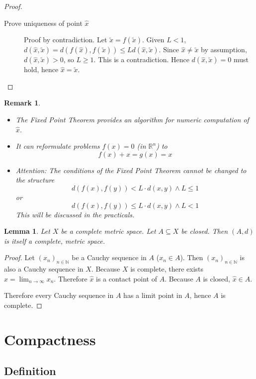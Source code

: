 \documentclass{article}
\newtheorem{lemma}{Lemma}  \numberwithin{lemma}{section}
\newtheorem{remark}{Remark}  \numberwithin{remark}{section}
\begin{document}
\begin{proof}
\begin{description}
  \item[Prove uniqueness of point $\hat{x}$]
    Proof by contradiction.
    Let $\tilde{x} = f(\tilde{x})$. Given $L < 1$, $d(\hat{x}, \tilde{x}) = d(f(\hat{x}), f(\tilde{x})) \leq L d(\hat{x}, \tilde{x})$.
    Since $\hat{x} \neq \tilde{x}$ by assumption, $d(\hat{x}, \tilde{x}) > 0$, so $L \geq 1$. This is a contradiction.
    Hence $d(\hat{x}, \tilde{x}) = 0$ must hold, hence $\hat{x} = \tilde{x}$.
  \end{description}
\end{proof}

\begin{remark}
  \begin{itemize}
  	\item The Fixed Point Theorem provides an algorithm for numeric computation of $\hat{x}$.
    \item It can reformulate problems $f(x) = 0$ (in $\mathbb R^n$) to
      \[ f(x) + x = g(x) = x \]
    \item Attention: The conditions of the Fixed Point Theorem cannot be changed to the structure
      \[ d(f(x), f(y)) < L \cdot d(x, y) \land L \leq 1 \]
      or
      \[ d(f(x), f(y)) \leq L \cdot d(x, y) \land L < 1 \]
      This will be discussed in the practicals.
  \end{itemize}
\end{remark}

\begin{lemma} %
  \label{lemma7}
  Let $X$ be a complete metric space. Let $A \subseteq X$ be closed.
  Then $(A, d)$ is itself a complete, metric space.
\end{lemma}

\begin{proof}
  Let $(x_n)_{n \in \mathbb N}$ be a Cauchy sequence in $A$ ($x_n \in A$).
  Then $(x_n)_{n \in \mathbb N}$ is also a Cauchy sequence in $X$.
  Because $X$ is complete, there exists $\hat{x} = \lim_{n\to\infty} x_n$.
  Therefore $\hat{x}$ is a contact point of $A$.
  Because $A$ is closed, $\hat{x} \in A$.

  Therefore every Cauchy sequence in $A$ has a limit point in $A$,
  hence $A$ is complete.
\end{proof}

\section{Compactness}
\subsection{Definition}
\end{document}
